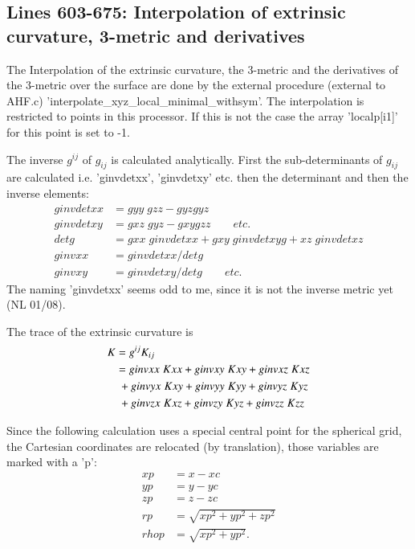 \documentclass[11pt,a4paper,twoside]{article}
\begin{document}
\subsection{Lines 603-675: Interpolation of extrinsic curvature, 
3-metric and derivatives}
The Interpolation of the extrinsic curvature, the 3-metric and the
derivatives of the 3-metric over the surface are done by the 
external procedure (external to AHF.c)
'interpolate\_xyz\_local\_minimal\_withsym'.
The interpolation is restricted to points in this processor. If this is 
not the case the array 'localp[i1]' for this point is set to -1.

The inverse $g^{ij}$ of $g_{ij}$ is calculated analytically. First the
sub-determinants of $g_{ij}$ are calculated i.e. 'ginvdetxx', 
'ginvdetxy' etc. then the determinant and then the inverse elements:
\begin{align}
  ginvdetxx &= gyy \;gzz - gyz gyz \\
  ginvdetxy &= gxz \;gyz - gxy gzz \qquad etc.\\
  detg &= gxx \; ginvdetxx + gxy \; ginvdetxyg + xz \; ginvdetxz\\
  ginvxx&=ginvdetxx/detg\\
  ginvxy&=ginvdetxy/detg \qquad etc.
\end{align}
The naming 'ginvdetxx' seems odd to me, since it is not the inverse
metric yet (NL 01/08).

The trace of the extrinsic curvature is
\begin{align}
  K&= g^{ij} K_{ij}\\
   &=    ginvxx\;Kxx + ginvxy\;Kxy + ginvxz\;Kxz \notag\\
   &\;  +ginvyx\;Kxy + ginvyy\;Kyy + ginvyz\;Kyz \notag\\
   &\;  +ginvzx\;Kxz + ginvzy\;Kyz + ginvzz\;Kzz
\end{align}

Since the following calculation uses a special central point for the 
spherical grid, the Cartesian coordinates are relocated (by translation),
those variables are marked with a 'p':
\begin{align}
  xp &= x-xc \\
  yp &= y-yc \\
  zp &= z-zc \\
  rp &= \sqrt{xp^2 + yp^2 +zp^2}\\
  rhop &= \sqrt{xp^2 + yp^2}.
\end{align}
\end{document}
